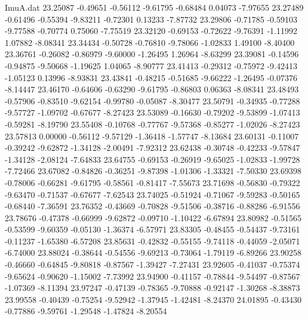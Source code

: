 \begin{filecontents}{ImuA.dat}
  23.25087   -0.49651   -0.56112   -9.61795   -0.68484    0.04073   -7.97655
  23.27489   -0.61496   -0.55394   -9.83211   -0.72301    0.13233   -7.87732
  23.29806   -0.71785   -0.59103   -9.77588   -0.70774    0.75060   -7.75519
  23.32120   -0.69153   -0.72622   -9.76391   -1.11992    1.07882   -8.08341
  23.34434   -0.50728   -0.76810   -9.78066   -1.02833    1.49100   -8.40400
  23.36761   -0.26082   -0.86979   -9.60000   -1.26495    1.26964   -8.63299
  23.39081   -0.14596   -0.94875   -9.50668   -1.19625    1.04065   -8.90777
  23.41413   -0.29312   -0.75972   -9.42413   -1.05123    0.13996   -8.93831
  23.43841   -0.48215   -0.51685   -9.66222   -1.26495   -0.07376   -8.14447
  23.46170   -0.64606   -0.63290   -9.61795   -0.86803    0.06363   -8.08341
  23.48493   -0.57906   -0.83510   -9.62154   -0.99780   -0.05087   -8.30477
  23.50791   -0.34935   -0.77288   -9.57727   -1.09702   -0.67677   -8.27423
  23.53089   -0.16630   -0.79202   -9.53899   -1.07413   -0.59281   -8.19790
  23.55408   -0.10768   -0.77767   -9.57368   -0.85277   -1.02026   -8.27423
  23.57813    0.00000   -0.56112   -9.57129   -1.36418   -1.57747   -8.13684
  23.60131   -0.11007   -0.39242   -9.62872   -1.34128   -2.00491   -7.92312
  23.62438   -0.30748   -0.42233   -9.57847   -1.34128   -2.08124   -7.64833
  23.64755   -0.69153   -0.26919   -9.65025   -1.02833   -1.99728   -7.72466
  23.67082   -0.84826   -0.36251   -9.87398   -1.01306   -1.33321   -7.50330
  23.69398   -0.78006   -0.66281   -9.61795   -0.58561   -0.81417   -7.55673
  23.71698   -0.56830   -0.79322   -9.63470   -0.71537   -0.67677   -7.62543
  23.74025   -0.51924   -0.71067   -9.59283   -0.50165   -0.68440   -7.36591
  23.76352   -0.43669   -0.70828   -9.51506   -0.38716   -0.88286   -6.91556
  23.78676   -0.47378   -0.66999   -9.62872   -0.09710   -1.10422   -6.67894
  23.80982   -0.51565   -0.53599   -9.60359   -0.05130   -1.36374   -6.57971
  23.83305   -0.48455   -0.54437   -9.73161   -0.11237   -1.65380   -6.57208
  23.85631   -0.42832   -0.55155   -9.74118   -0.44059   -2.05071   -6.74000
  23.88024   -0.38644   -0.54556   -9.69213   -0.73064   -1.79119   -6.89266
  23.90258   -0.46660   -0.64845   -9.80818   -0.87567   -1.39427   -7.27431
  23.92605   -0.41037   -0.75374   -9.65624   -0.90620   -1.15002   -7.73992
  23.94900   -0.41157   -0.78844   -9.54497   -0.87567   -1.07369   -8.11394
  23.97247   -0.47139   -0.78365   -9.70888   -0.92147   -1.30268   -8.38873
  23.99558   -0.40439   -0.75254   -9.52942   -1.37945   -1.42481   -8.24370
  24.01895   -0.43430   -0.77886   -9.59761   -1.29548   -1.47824   -8.20554

\end{filecontents}
